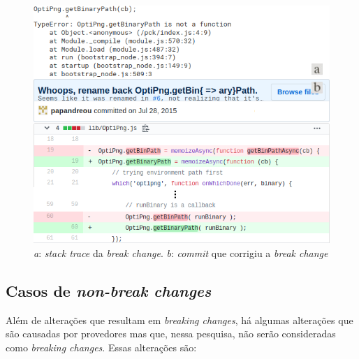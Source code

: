 \begin{figure}
    \centering
    \includegraphics[scale=0.65]{figuras/bc_optipng.png}
    \caption{\textit{a}: \textit{stack trace} da \textit{break change}. \textit{b}: \textit{commit} que corrigiu a \textit{break change}}
    \label{fig:bc_optipng}
\end{figure}{}

\subsection{Casos de \textit{non-break changes}}
Além de alterações que resultam em \textit{breaking changes}, há algumas alterações que são causadas por provedores mas que, nessa pesquisa, não serão consideradas como \textit{breaking changes}. Essas alterações são:

